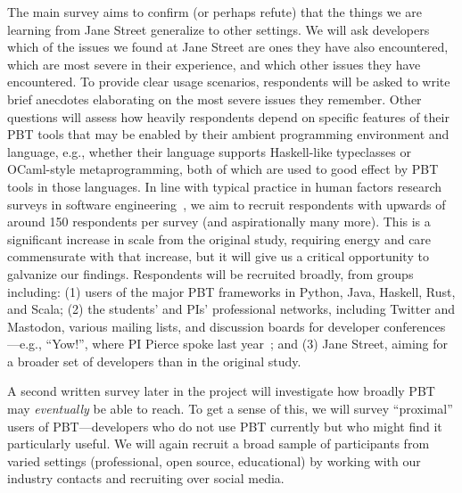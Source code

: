 The main survey
aims to confirm (or perhaps refute) that
the things we are learning from Jane Street generalize to other settings.
We will
ask developers which of the issues we found at Jane Street are
ones they have also encountered, which are most severe
in their experience, and which
other issues they have encountered.
To provide
clear usage scenarios, respondents will
be asked to write brief anecdotes elaborating on the
most severe issues they remember.  Other questions will assess how
heavily respondents depend on specific features of their PBT tools
that may be enabled by their
ambient programming environment and language, e.g., whether their
language supports Haskell-like typeclasses or OCaml-style
metaprogramming, both of which are used to good effect by
PBT tools in those languages.
In line with typical practice in
human factors research surveys in software
engineering~\cite{ref:robillard2009makes,ref:uddin2015api,ref:murphyhill2019predicts},
we aim to recruit respondents with upwards of around 150 respondents per survey
(and aspirationally many more). This is a significant increase in scale from the
original study, requiring energy and care commensurate with that increase, but
it will give us a critical opportunity to galvanize our findings.
Respondents will
be recruited broadly, from groups including:
(1)
users of the major PBT frameworks in Python, Java, Haskell, Rust, and Scala;
(2) the students' and PIs' professional networks, including
Twitter and Mastodon, various mailing lists, and discussion boards for developer
conferences---e.g., ``Yow!'', where PI Pierce spoke last
year~\cite{Pierce:Yow22};
and (3) Jane Street, aiming for
a broader set of developers than in the original study.

A second written survey later in the project will investigate
how broadly PBT may {\em eventually} be able to reach.  To get a sense
of this, we will
survey ``proximal'' users of PBT---developers who do not use PBT
currently but who might find it particularly
useful.
We
will again recruit a broad sample of participants from varied settings
(professional, open source, educational) by working with our industry contacts
and recruiting over social media.


%

